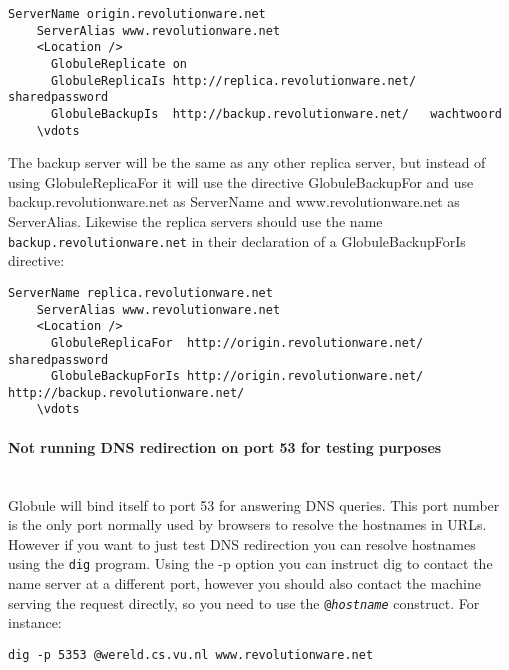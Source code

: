 \documentclass[10pt,a4paper]{article}
\makeatletter
\newenvironment{p}{\@open{P}{}}{\@close{P}}
\newenvironment{p}{}{\par}
\makeatother
\begin{document}
\begin{Verbatim}[label=Origin server's configuration]
    ServerName origin.revolutionware.net
    ServerAlias www.revolutionware.net
    <Location />
      GlobuleReplicate on
      GlobuleReplicaIs http://replica.revolutionware.net/  sharedpassword
      GlobuleBackupIs  http://backup.revolutionware.net/   wachtwoord
    \vdots
\end{Verbatim}

\begin{p}
The backup server will be the same as any other replica server, but instead of
using GlobuleReplicaFor it will use the directive GlobuleBackupFor and use
backup.revolutionware.net as ServerName and www.revolutionware.net as
ServerAlias.  Likewise the replica servers should use the name
\verb!backup.revolutionware.net! in their declaration of a GlobuleBackupForIs
directive:
\end{p}

\begin{Verbatim}[label=Replica server's configuration]
    ServerName replica.revolutionware.net
    ServerAlias www.revolutionware.net
    <Location />
      GlobuleReplicaFor  http://origin.revolutionware.net/  sharedpassword
      GlobuleBackupForIs http://origin.revolutionware.net/  http://backup.revolutionware.net/
    \vdots
\end{Verbatim}

\paragraph*{Not running DNS redirection on port 53 for testing purposes}~\\

\begin{p}
Globule will bind itself to port 53 for answering DNS queries.  This port
number is the only port normally used by browsers to resolve the hostnames in
URLs.  However if you want to just test DNS redirection you can resolve
hostnames using the \verb!dig! program.  Using the -p option you can instruct
dig to contact the name server at a different port, however you should also
contact the machine serving the request directly, so you need to use the
\texttt{@\textit{hostname}} construct.  For instance:
\end{p}

\begin{Verbatim}
dig -p 5353 @wereld.cs.vu.nl www.revolutionware.net
\end{Verbatim}
\end{document}
